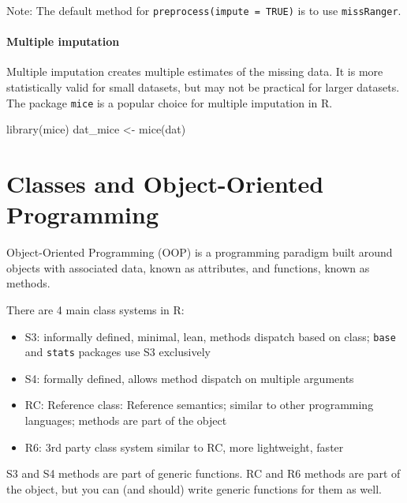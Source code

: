 \documentclass[
]{book}
\newenvironment{Shaded}{\begin{snugshade}}{\end{snugshade}}
\newcommand{\FunctionTok}[1]{\textcolor[rgb]{0.00,0.00,0.00}{#1}}
\newcommand{\NormalTok}[1]{#1}
\newcommand{\OtherTok}[1]{\textcolor[rgb]{0.56,0.35,0.01}{#1}}
\providecommand{\tightlist}{%
  \setlength{\itemsep}{0pt}\setlength{\parskip}{0pt}}
\begin{document}
Note: The default method for \texttt{preprocess(impute\ =\ TRUE)} is to use \texttt{missRanger}.

\hypertarget{multiple-imputation}{%
\subsubsection{Multiple imputation}\label{multiple-imputation}}

Multiple imputation creates multiple estimates of the missing data. It is more statistically valid for small datasets, but may not be practical for larger datasets. The package \texttt{mice} is a popular choice for multiple imputation in R.

\begin{Shaded}
\begin{Highlighting}[]
\FunctionTok{library}\NormalTok{(mice)}
\NormalTok{dat\_mice }\OtherTok{\textless{}{-}} \FunctionTok{mice}\NormalTok{(dat)}
\end{Highlighting}
\end{Shaded}

\hypertarget{classes}{%
\chapter{Classes and Object-Oriented Programming}\label{classes}}

Object-Oriented Programming (OOP) is a programming paradigm built around objects with associated data, known as attributes, and functions, known as methods.

There are 4 main class systems in R:

\begin{itemize}
\tightlist
\item
  S3: informally defined, minimal, lean, methods dispatch based on class; \texttt{base} and \texttt{stats} packages use S3 exclusively
\item
  S4: formally defined, allows method dispatch on multiple arguments
\item
  RC: Reference class: Reference semantics; similar to other programming languages; methods are part of the object
\item
  R6: 3rd party class system similar to RC, more lightweight, faster
\end{itemize}

S3 and S4 methods are part of generic functions. RC and R6 methods are part of the object, but you can (and should) write generic functions for them as well.
\end{document}
